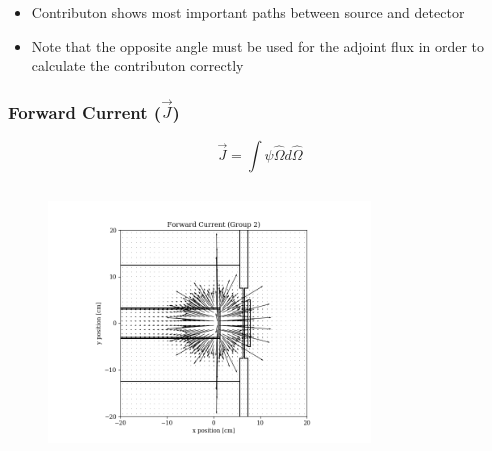 \documentclass[t]{beamer}
\begin{document}
\begin{frame}
\begin{columns}
\begin{figure}
    \end{figure}
  \end{columns}
  \begin{itemize}
    \item Contributon shows most important paths between source and detector
    \item Note that the opposite angle must be used for the adjoint flux in
          order to calculate the contributon correctly
  \end{itemize}
\end{frame}

\begin{frame}
  \frametitle{Forward Current ($\vec{J}$)}
  \vskip-0.25in
  \begin{equation}
    \vec{J} = \int\psi\hat{\Omega}d\hat{\Omega}
  \end{equation}
  \vskip-0.25in
  \begin{columns}
    \begin{figure}
      \includegraphics[trim={0.7in 0.15in 1.05in 0.4in},clip,scale=0.36]{images/current_fwd_g02.png}
    \end{figure}
    \begin{figure}

\end{figure}
\end{columns}
\end{frame}
\end{document}
